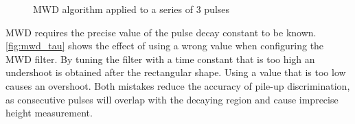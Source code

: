 \begin{figure}[H]


  \caption{MWD algorithm applied to a series of 3 pulses}
  \label{fig:mwd_staircase} 
\end{figure}


MWD requires the precise value of the pulse decay constant to
be known. \autoref{fig:mwd_tau} shows the effect of using a wrong value
when configuring the MWD filter. By tuning the filter with a time constant
that is too high an undershoot is obtained after the rectangular shape.
Using a value that is too low causes an overshoot.
Both mistakes reduce the accuracy of pile-up discrimination, 
as consecutive pulses will overlap with the decaying region
and cause imprecise height measurement.

